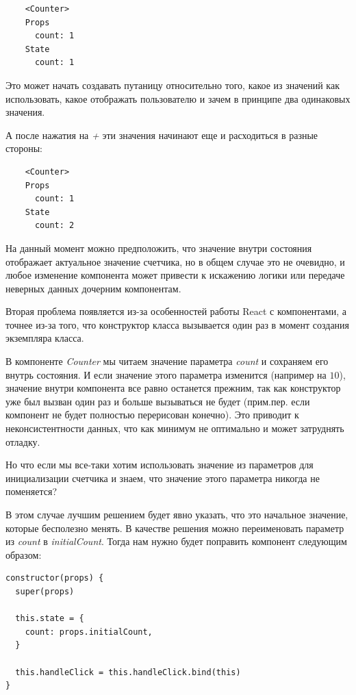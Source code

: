 \begin{lstlisting}
    <Counter>
    Props
      count: 1
    State
      count: 1
\end{lstlisting}

Это может начать создавать путаницу относительно того, какое из значений как использовать, какое отображать пользователю и зачем в принципе два одинаковых значения.

А после нажатия на \textit{+} эти значения начинают еще и расходиться в разные стороны:

\begin{lstlisting}
    <Counter>
    Props
      count: 1
    State
      count: 2
\end{lstlisting}

На данный момент можно предположить, что значение внутри состояния отображает актуальное значение счетчика, но в общем случае это не очевидно, и любое изменение компонента может привести к искажению логики или передаче неверных данных дочерним компонентам.

Вторая проблема появляется из-за особенностей работы React с компонентами, а точнее из-за того, что конструктор класса вызывается один раз в момент создания экземпляра класса.

В компоненте \textit{Counter} мы читаем значение параметра \textit{count} и сохраняем его внутрь состояния. И если значение этого параметра изменится (например на $10$), значение внутри компонента все равно останется прежним, так как конструктор уже был вызван один раз и больше вызываться не будет (прим.пер. если компонент не будет полностью перерисован конечно). Это приводит к неконсистентности данных, что как минимум не оптимально и может затруднять отладку.

Но что если мы все-таки хотим использовать значение из параметров для инициализации счетчика и знаем, что значение этого параметра никогда не поменяется?

В этом случае лучшим решением будет явно указать, что это начальное значение, которые бесполезно менять. В качестве решения можно переименовать параметр из \textit{count} в \textit{initialCount}. Тогда нам нужно будет поправить компонент следующим образом:

\begin{lstlisting}
constructor(props) {
  super(props)
  
  this.state = {
    count: props.initialCount,
  }
  
  this.handleClick = this.handleClick.bind(this)
}
\end{lstlisting}

